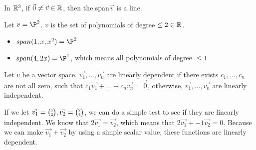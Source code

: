   In $\mathbb{R}^3$, if $\vec{0}\neq\vec{v}\in\mathbb{R}$, then the span$\vec{v}$ is a line.

  \begin{problem}
    Let $v=\P^2$. $v$ is the set of polynomials of degree $\le2\in\mathbb{R}$.

    \begin{itemize}
      \item $span(1,x,x^2)=\P^2$
      \item $span(4,2x)=\P^1$, which means all polynomials of degree $\le1$
    \end{itemize}

  \end{problem}
  \begin{definition}
    Let $v$ be a vector space. $\vec{v_1},\dots,\vec{v_n}$ are linearly dependent if there exists $c_1,\dots,c_n$ are not all zero, such that $c_1\vec{v_1}+\dots+c_n\vec{v_n}=\vec{0}$, otherwise, $\vec{v_1},\dots,\vec{v_n}$ are linearly independent.
  \end{definition}
  
  If we let $\vec{v_1}=\SmallMatrix{1\\2},\vec{v_2}=\SmallMatrix{2\\4}$, we can do a simple test to see if they are linearly independent. We know that $2\vec{v_1}=\vec{v_2}$, which means that $2\vec{v_1}+-1\vec{v_2}=0$. Because we can make $\vec{v_1}+\vec{v_2}$ by using a simple scalar value, these functions are linearly dependent.

